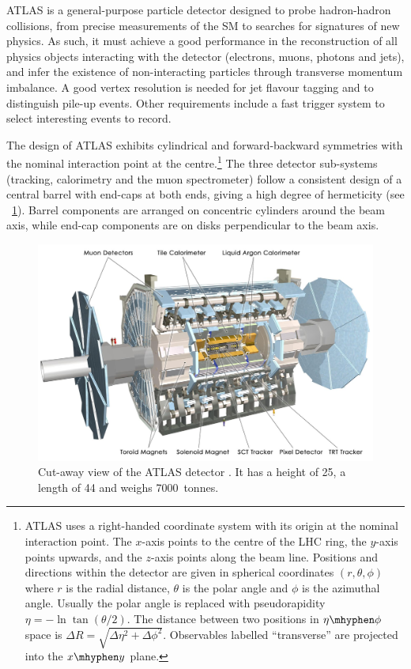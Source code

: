 
ATLAS is a general-purpose particle detector designed to probe hadron-hadron collisions, 
from precise measurements of the \ac{SM} to searches for signatures of new physics.
As such, it must achieve a good performance in the reconstruction of all physics objects 
interacting with the detector (electrons, muons, photons and jets), and infer the 
existence of non-interacting particles through transverse momentum imbalance. A good 
vertex resolution is needed for jet flavour tagging and to distinguish pile-up events. 
Other requirements include a fast trigger system to select interesting events to record.

The design of ATLAS exhibits cylindrical and forward-backward symmetries with the nominal 
interaction point at the centre.\footnote{
	ATLAS uses a right-handed coordinate system with its origin at the nominal 
	interaction point. The $x$-axis points to the centre of the \ac{LHC} ring, the 
	$y$-axis points upwards, and the $z$-axis points along the beam line. Positions and 
	directions within the detector are given in spherical coordinates $(r, \theta, \phi)$ 
	where $r$ is the radial distance, $\theta$ is the polar angle and $\phi$ is the 
	azimuthal angle. Usually the polar angle is replaced with pseudorapidity 
	$\eta = -\ln\tan(\theta/2)$. The distance between two positions in $\eta\mhyphen\phi$ 
	space is $\Delta R = \sqrt{\Delta\eta^2 + \Delta\phi^2}$.
	Observables labelled ``transverse'' are projected into the $x\mhyphen y$ plane.
} 
The three detector sub-systems (tracking, calorimetry and the muon spectrometer) 
follow a consistent design of a central barrel with end-caps at both ends, giving a high 
degree of hermeticity (see \Figure~\ref{fig:atlas_whole}). Barrel components are arranged 
on concentric cylinders around the beam axis, while end-cap components are on disks 
perpendicular to the beam axis.

\begin{figure}
	\includegraphics[width=\hugefigwidth]{tex/experiment/atlas_whole}
	\caption{Cut-away view of the ATLAS detector \cite{ATLAS-detector}. It has a height 
	of \unit{25}{\metre}, a length of \unit{44}{\metre} and weighs 7000~tonnes.}
	\label{fig:atlas_whole}
\end{figure}

